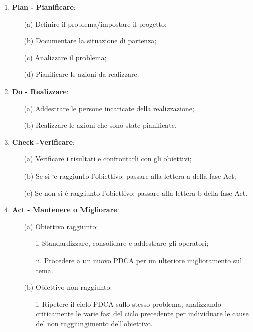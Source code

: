 \begin{enumerate}
	\item \textbf{Plan - Pianificare}:
		\begin{itemize}
			\item[(a)] Definire il problema/impostare il progetto;
			\item[(b)] Documentare la situazione di partenza;
			\item[(c)] Analizzare il problema;
			\item[(d)] Pianificare le azioni da realizzare.
		\end{itemize}

	\item \textbf{Do - Realizzare}:
		\begin{itemize}
			\item[(a)] Addestrare le persone incaricate della realizzazione;
			\item[(b)] Realizzare le azioni che sono state pianificate.
		\end{itemize}
	
	\item \textbf{Check -Verificare}:
		\begin{itemize}
			\item[(a)] Verificare i risultati e confrontarli con gli obiettivi;
			\item[(b)] Se si `e raggiunto l'obiettivo: passare alla lettera a della fase Act;
			\item[(c)] Se non si è raggiunto l'obiettivo: passare alla lettera b della fase Act.
		\end{itemize}
	
	\item \textbf{Act - Mantenere o Migliorare}:
		\begin{itemize}
			\item[(a)] Obiettivo raggiunto:
				\begin{itemize}
					\item[i.] Standardizzare, consolidare e addestrare gli operatori;
					\item[ii.] Procedere a un nuovo PDCA per un ulteriore miglioramento sul tema.
				\end{itemize}
			\item[(b)] Obiettivo non raggiunto:
				\begin{itemize}
					\item[i.] Ripetere il ciclo PDCA sullo stesso problema, analizzando criticamente le varie fasi del ciclo precedente per individuare le cause del non raggiungimento dell'obiettivo.
				\end{itemize}
		\end{itemize} 
\end{enumerate}  \pagebreak \\

